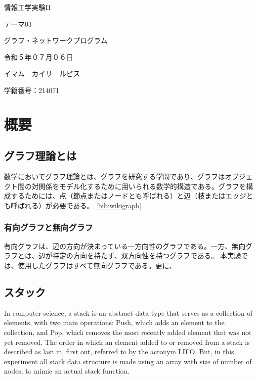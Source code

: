 \documentclass[a4j, titlepage]{jarticle}
\begin{document}
  \begin{center}
  \huge 情報工学実験II\par
  \vspace{15mm}
  \huge テーマ03 \par
  \huge グラフ・ネットワークプログラム \par
  \vspace{15mm}
  \vspace{20mm}
  \vspace{100mm}
  \Large 令和５年０７月０６日 \par
  \vspace{15mm}
  \Large イマム　カイリ　ルビス \par
  \vspace{10mm}
  \Large 学籍番号：214071\par
  \vspace{10mm}
\end{center}
\clearpage

\tableofcontents
\clearpage

\section{概要}
    \subsection{グラフ理論とは}
    数学においてグラフ理論とは、グラフを研究する学問であり、グラフはオブジェクト間の対関係をモデル化するために用いられる数学的構造である。グラフを構成するためには、点（節点またはノードとも呼ばれる）と辺（枝またはエッジとも呼ばれる）が必要である。 \ref{bib:wikigraph}
    
    \subsubsection{有向グラフと無向グラフ}
    有向グラフは、辺の方向が決まっている一方向性のグラフである。一方、無向グラフとは、辺が特定の方向を持たず、双方向性を持つグラフである。
    本実験では、使用したグラフはすべて無向グラフである。更に、

    \subsection{スタック} %
    In computer science, a stack is an abstract data type that serves as a collection of elements, with two main operations:
    Push, which adds an element to the collection, and
    Pop, which removes the most recently added element that was not yet removed.
    The order in which an element added to or removed from a stack is described as last in, first out, referred to by the acronym LIFO.
    But, in this experiment all stack data structure is made using an array with size of number of nodes, to mimic an actual stack function.
\end{document}
